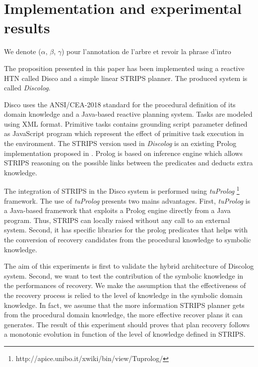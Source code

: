 \documentclass[conference]{IEEEtran}
\begin{document}
	\section{Implementation and experimental results}
	We denote ($\alpha$, $\beta$, $\gamma$) pour l'annotation de l'arbre et revoir la phrase d'intro
	\par The proposition presented in this paper has been implemented using a reactive HTN called  Disco \cite{rich2009building} and a simple linear STRIPS planner. The produced system is called \emph{Discolog}. 
	\par  Disco uses the ANSI/CEA-2018 standard for the procedural definition of its domain knowledge and a Java-based reactive planning system. Tasks are modeled using XML format. Primitive tasks contains grounding script parameter defined	as JavaScript program which represent the effect of  primitive task execution in the environment. The STRIPS version used in \emph{Discolog} is an existing  Prolog implementation proposed in \cite{poole1998computational}. Prolog is based on inference engine  which allows STRIPS reasoning on the possible links between the predicates and deducts extra knowledge.
	\par  The integration of STRIPS in the Disco system is performed using  \emph{tuProlog} \footnote{http://apice.unibo.it/xwiki/bin/view/Tuprolog/} framework. The use of  \emph{tuProlog} presents two mains advantages. First, \emph{tuProlog} is a Java-based framework that exploits a Prolog engine directly from a Java program. Thus, STRIPS can locally raised without any call to an external system. Second, it has specific libraries for the prolog predicates that helps with the conversion of recovery candidates from the procedural knowledge to symbolic knowledge. 
	
	\par  The aim of this  experiments is first to validate the hybrid architecture of Discolog system. Second, we want to test the contribution of the symbolic knowledge in the performances of recovery. We make the assumption that the effectiveness of the recovery process is relied to the level of knowledge in the symbolic domain knowledge. In fact, we assume that the more information STRIPS planner gets from the procedural domain knowledge, the more effective recover plans it can generates. The result of this experiment should proves that plan recovery follows a monotonic evolution in function of the level of knowledge defined in STRIPS.
\end{document}
